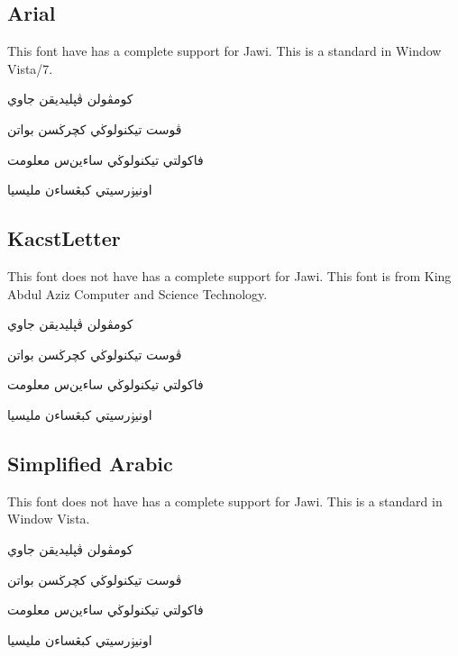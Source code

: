 \documentclass[12pt,a4paper]{IEEEconf}
\begin{document}
\subsection{Arial}
This font  have has a complete support for Jawi. This is a standard in Window Vista/7.
\newfontfamily{}

\begin{arab}
\begin{center}
کومڤولن ڤڽليديقن جاوي
\par  
ڤوست تيكنولوڬي کچرڬسن بواتن
\par  
فاکولتي تيكنولوڬي ساءين‌س معلومت
\par  
اونيۏرسيتي کبڠساءن مليسيا
\par  
\end{center}
\end{arab}

\subsection{KacstLetter}
This font does not have has a complete support for Jawi. This font is from King Abdul Aziz Computer and Science Technology.
\newfontfamily{}

\begin{arab}
\begin{center}
کومڤولن ڤڽليديقن جاوي
\par  
ڤوست تيكنولوڬي کچرڬسن بواتن
\par  
فاکولتي تيكنولوڬي ساءين‌س معلومت
\par  
اونيۏرسيتي کبڠساءن مليسيا
\par  
\end{center}
\end{arab}

\subsection{Simplified Arabic}
This font does not have has a complete support for Jawi. This is a standard in Window Vista.
\newfontfamily{}

\begin{arab}
\begin{center}
کومڤولن ڤڽليديقن جاوي
\par  
ڤوست تيكنولوڬي کچرڬسن بواتن
\par  
فاکولتي تيكنولوڬي ساءين‌س معلومت
\par  
اونيۏرسيتي کبڠساءن مليسيا
\par  
\end{center}
\end{arab}
\end{document}
